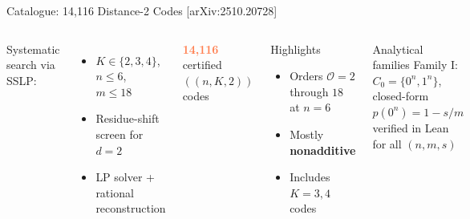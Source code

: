 \documentclass[aspectratio=169,t]{beamer}
\newcommand{\chk}{\textcolor{Sage}{\checkmark}}
\begin{document}
\begin{frame}{Catalogue: 14,116 Distance-2 Codes
  \hfill{\footnotesize\textcolor{Slate}{[arXiv:2510.20728]}}}

\begin{columns}[T]
Systematic search via SSLP:
\begin{itemize}\setlength\itemsep{1pt}
\item $K\in\{2,3,4\}$, $n\leq 6$, $m\leq 18$
\item Residue-shift screen for $d{=}2$
\item LP solver + rational reconstruction
\end{itemize}

\begin{center}
{\Huge\textcolor{Coral}{\textbf{14,116}}}\\
certified $((n,K,2))$ codes
\end{center}

\begin{block}{Highlights}
\begin{itemize}\setlength\itemsep{1pt}
\item Orders $\mathcal{O}=2$ through $18$ at $n=6$
\item Mostly \textbf{nonadditive}
\item Includes $K=3,4$ codes
\end{itemize}
\end{block}

\begin{exampleblock}{Analytical families}
Family I: $C_0=\{0^n,1^n\}$,\\
closed-form $p(0^n)=1-s/m$\\
\chk  verified in Lean for all $(n,m,s)$
\end{exampleblock}
\end{columns}
\end{frame}
\end{document}
